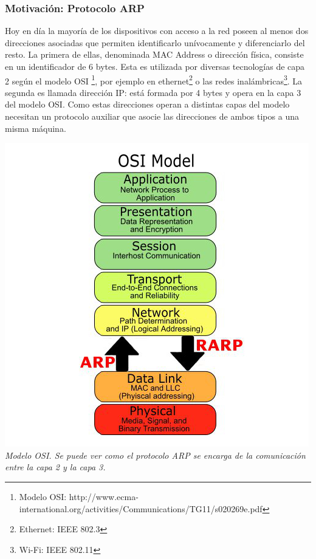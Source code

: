 \subsubsection{Motivaci\'on: Protocolo ARP}
Hoy en día la mayoría de los dispositivos con acceso a la red poseen al menos dos direcciones asociadas que permiten identificarlo unívocamente y diferenciarlo del resto. La primera de ellas, denominada MAC Address o dirección física, consiste en un identificador de 6 bytes. Esta es utilizada por diversas tecnologías de capa 2 según el modelo OSI \footnote{Modelo OSI: http://www.ecma-international.org/activities/Communications/TG11/s020269e.pdf}, por ejemplo en ethernet\footnote{Ethernet: IEEE 802.3} o las redes inalámbricas\footnote{Wi-Fi: IEEE 802.11}. La segunda es llamada dirección IP: está formada por 4 bytes y opera en la capa 3 del modelo OSI. Como estas direcciones operan a distintas capas del modelo necesitan un protocolo auxiliar que asocie las direcciones de ambos tipos a una misma máquina.

\vspace{\baselineskip}
        \begin{center}
        \includegraphics[scale=0.40]{fig/osimodel.jpeg}        
        \vspace{1pt}
        \footnotesize\textit{Modelo OSI. Se puede ver como el protocolo ARP se encarga de la comunicación entre la capa 2 y la capa 3.}
      \end{center}
    \vspace{\baselineskip}
\par


